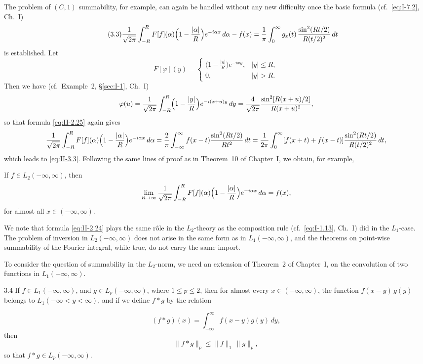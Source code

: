 The problem of $(C,1)$ summability, for example, can again be handled without any new difficulty once the basic formula (cf.\ \eqref{eq:I-7.2}, Ch.~I)
\begin{equation}\tag{3.3}\label{eq:II-3.3}
\frac{1}{\sqrt{2\pi}}\int_{-R}^{R}F[f](\alpha)\Bigl(1-\frac{|\alpha|}{R}\Bigr)e^{-i\alpha x}\,d\alpha-f(x)
=\frac{1}{\pi}\int_{0}^{\infty}g_{x}(t)\,\frac{\sin^{2}(Rt/2)}{R(t/2)^{2}}\,dt
\end{equation}
is established. Let
\[
F[\varphi](y)=
\begin{cases}
\bigl(1-\frac{|y|}{R}\bigr)e^{-ixy}, & |y|\le R,\\
0, & |y|>R.
\end{cases}
\]
Then we have (cf.\ Example~2, \S\ref{sec:I-1}, Ch.~I)
\[
\varphi(u)=\frac{1}{\sqrt{2\pi}}\int_{-R}^{R}\Bigl(1-\frac{|y|}{R}\Bigr)e^{-i(x+u)y}\,dy
=\frac{4}{\sqrt{2\pi}}\frac{\sin^{2}[R(x+u)/2]}{R(x+u)^{2}},
\]
so that formula \eqref{eq:II-2.25} again gives
\[
\frac{1}{\sqrt{2\pi}}\int_{-R}^{R}F[f](\alpha)\Bigl(1-\frac{|\alpha|}{R}\Bigr)e^{-i\alpha x}\,d\alpha
=\frac{2}{\pi}\int_{-\infty}^{\infty}f(x-t)\frac{\sin^{2}(Rt/2)}{Rt^{2}}\,dt
=\frac{1}{2\pi}\int_{0}^{\infty}[f(x+t)+f(x-t)]\frac{\sin^{2}(Rt/2)}{R(t/2)^{2}}\,dt,
\]
which leads to \eqref{eq:II-3.3}. Following the same lines of proof as in Theorem~10 of Chapter~I, we obtain, for example,

\begin{theorem}\label{thm:II-3}
If $f\in L_{2}(-\infty,\infty)$, then
\[
\lim_{R\to\infty}\frac{1}{\sqrt{2\pi}}\int_{-R}^{R}F[f](\alpha)\Bigl(1-\frac{|\alpha|}{R}\Bigr)e^{-i\alpha x}\,d\alpha=f(x),
\]
for almost all $x\in(-\infty,\infty)$.
\end{theorem}

We note that formula \eqref{eq:II-2.24} plays the same r\^ole in the $L_{2}$-theory as the composition rule (cf.\ \eqref{eq:I-1.13}, Ch.~I) did in the $L_{1}$-case. The problem of inversion in $L_{2}(-\infty,\infty)$ does not arise in the same form as in $L_{1}(-\infty,\infty)$, and the theorems on point-wise summability of the Fourier integral, while true, do not carry the same import.

To consider the question of summability in the $L_{2}$-norm, we need an extension of Theorem~2 of Chapter~I, on the convolution of two functions in $L_{1}(-\infty,\infty)$.

\begin{nstmt}{3.4}\label{eq:II-3.4}
If $f\in L_{1}(-\infty,\infty)$, and $g\in L_{p}(-\infty,\infty)$, where $1\le p\le 2$, then for almost every $x\in(-\infty,\infty)$, the function $f(x-y)\,g(y)$ belongs to $L_{1}(-\infty<y<\infty)$, and if we define $f*g$ by the relation
\end{nstmt}
\[
(f*g)(x)=\int_{-\infty}^{\infty}f(x-y)g(y)\,dy,
\]
then
\begin{equation}\tag{3.5}\label{eq:II-3.5}
\|f*g\|_{p}\le \|f\|_{1}\,\|g\|_{p},
\end{equation}
so that $f*g\in L_{p}(-\infty,\infty)$.

